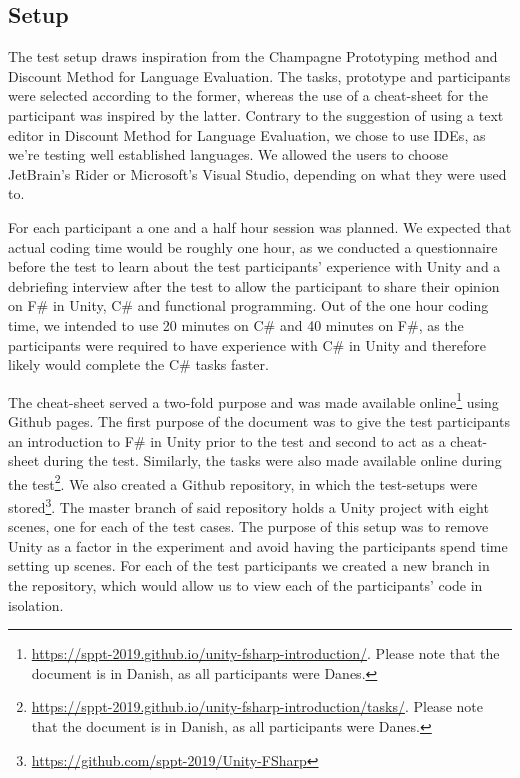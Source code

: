 \subsection{Setup}
The test setup draws inspiration from the Champagne Prototyping method and Discount Method for Language Evaluation. The tasks, prototype and participants were selected according to the former, whereas the use of a cheat-sheet for the participant was inspired by the latter. Contrary to the suggestion of using a text editor in Discount Method for Language Evaluation, we chose to use \glspl{IDE}, as we're testing well established languages. We allowed the users to choose JetBrain's Rider or Microsoft's Visual Studio, depending on what they were used to.

For each participant a one and a half hour session was planned. We expected that actual coding time would be roughly one hour, as we conducted a questionnaire before the test to learn about the test participants' experience with Unity and a debriefing interview after the test to allow the participant to share their opinion on F\# in Unity, C\# and functional programming. Out of the one hour coding time, we intended to use 20 minutes on C\# and 40 minutes on F\#, as the participants were required to have experience with C\# in Unity and therefore likely would complete the C\# tasks faster.

The cheat-sheet served a two-fold purpose and was made available online\footnote{\url{https://sppt-2019.github.io/unity-fsharp-introduction/}. Please note that the document is in Danish, as all participants were Danes.} using Github pages. The first purpose of the document was to give the test participants an introduction to F\# in Unity prior to the test and second to act as a cheat-sheet during the test. Similarly, the tasks were also made available online during the test\footnote{\url{https://sppt-2019.github.io/unity-fsharp-introduction/tasks/}. Please note that the document is in Danish, as all participants were Danes.}. We also created a Github repository, in which the test-setups were stored\footnote{\url{https://github.com/sppt-2019/Unity-FSharp}}. The master branch of said repository holds a Unity project with eight scenes, one for each of the test cases. The purpose of this setup was to remove Unity as a factor in the experiment and avoid having the participants spend time setting up scenes. For each of the test participants we created a new branch in the repository, which would allow us to view each of the participants' code in isolation.

